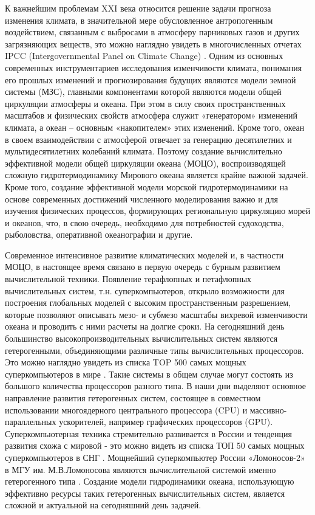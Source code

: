 
{\actuality}
К важнейшим проблемам XXI века относится решение задачи прогноза изменения климата, в значительной мере обусловленное антропогенным воздействием,
связанным с выбросами в атмосферу парниковых газов и других загрязняющих веществ, это можно наглядно увидеть в многочисленных отчетах
IPCC (Intergovernmental Panel on Climate Change) .
Одним из основных современных инструментариев исследования изменчивости климата, понимания его прошлых изменений и прогнозирования будущих являются модели земной системы (МЗС),
главными компонентами которой являются модели общей циркуляции атмосферы и океана.
При этом в силу своих пространственных масштабов и физических свойств атмосфера служит «генератором» изменений климата,
а океан – основным «накопителем» этих изменений. Кроме того, океан в своем взаимодействии с атмосферой отвечает за генерацию десятилетних
и мультидесятилетних колебаний климата.
Поэтому создание вычислительно эффективной модели общей циркуляции океана (МОЦО), воспроизводящей сложную гидротермодинамику
Мирового океана является крайне важной задачей. Кроме того, создание эффективной модели морской гидротермодинамики на основе современных достижений
численного моделирования важно и для изучения физических процессов, формирующих региональную циркуляцию морей и океанов, что,
в свою очередь, необходимо для потребностей судоходства, рыболовства, оперативной океанографии и другие.

Современное интенсивное развитие климатических моделей и, в частности МОЦО, в настоящее время связано в первую очередь с бурным развитием вычислительной техники.
Появление терафлопных и петафлопных вычислительных систем, т.н. суперкомпьютеров, открыло возможности для построения глобальных моделей с
высоким пространственным разрешением, которые позволяют описывать мезо- и субмезо масштабы вихревой изменчивости океана и проводить с ними расчеты на долгие сроки.
На сегодняшний день большинство высокопроизводительных вычислительных систем являются гетерогенными, объединяющими различные типы вычислительных процессоров.
Это можно наглядно увидеть из списка TOP 500 самых мощных суперкомпьютеров в мире .
Такие системы в общем случае могут состоять из большого количества процессоров разного типа.
В наши дни выделяют основное направление развития гетерогенных систем, состоящее в совместном использовании многоядерного центрального процессора (CPU)
и массивно-параллельных ускорителей, например графических процессоров (GPU).
Суперкомпьютерная техника стремительно развивается в России и тенденция развития схожа с мировой - это можно видеть из списка ТОП 50
самых мощных суперкомпьютеров в СНГ .
Мощнейший суперкомпьютер России «Ломоносов-2» в МГУ им. М.В.Ломоносова являются вычислительной системой именно гетерогенного типа .
Создание модели гидродинамики океана, использующую эффективно ресурсы таких гетерогенных вычислительных систем,
является сложной и актуальной на сегодняшний день задачей.

